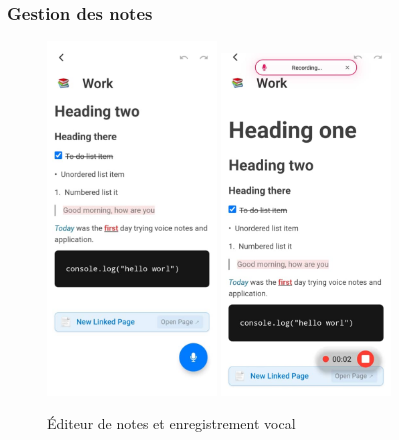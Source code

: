 \subsubsection{Gestion des notes}
\begin{figure}[H]
    \centering
    \includegraphics[width=0.4\textwidth]{assets/docs/mobile/note-page.png}
    \hfill
    \includegraphics[width=0.4\textwidth]{assets/docs/mobile/note-page-recording.png}
    \caption{Éditeur de notes et enregistrement vocal}
    \label{fig:mobile-editor}
\end{figure}

